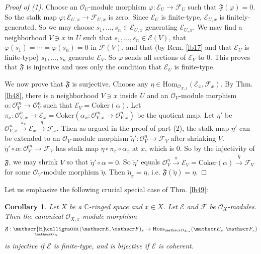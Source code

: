 \documentclass[12pt,b5paper,notitlepage]{report}
\theoremstyle{definition}
\theoremstyle{plain}
\newtheorem{co}[df]{Corollary}
\DeclareMathOperator{\shom}{\mathscr{H}\text{\kern -3pt {\calligra\large om}}\,}
\newcommand{\fk}{\mathfrak}
\newcommand{\wtd}{\widetilde}
\newcommand{\Hom}{\mathrm{Hom}}
\newcommand{\scr}{\mathscr}
\newcommand{\Cbb}{\mathbb C}
\newcommand{\Cok}{\mathrm{Coker}}
\numberwithin{equation}{section}
\begin{document}
\begin{proof}[Proof of (1)]
Choose an $\scr O_U$-module morphism $\varphi:\scr E_U\rightarrow\scr F_U$ such that $\fk F(\varphi)=0$. So the stalk map $\varphi:\scr E_{U,x}\rightarrow\scr F_{U,x}$ is zero. Since $\scr E_U$ is finite-type, $\scr E_{U,x}$ is finitely-generated. So we may choose $s_1,\dots,s_n\in\scr E_{U,x}$ generating $\scr E_{U,x}$. We may find a neighborhood $V\ni x$ in $U$ such that $s_1,\dots,s_n\in\scr E(V)$, that $\varphi(s_1)=\cdots=\varphi(s_n)=0$ in $\scr F(V)$, and that (by Rem. \ref{lb17} and that $\scr E_U$ is finite-type) $s_1,\dots,s_n$ generate $\scr E_V$. So $\varphi$ sends all sections of $\scr E_V$ to $0$. This proves that $\fk F$ is injective and uses only the condition that $\scr E_U$ is finite-type.

We now prove that $\fk F$ is surjective. Choose any $\eta\in\Hom_{\scr O_{X,x}}(\scr E_x,\scr F_x)$. By Thm. \ref{lb48}, there is a neighborhood $V\ni x$ inside $U$ and an $\scr O_V$-module morphism $\alpha:\scr O_V^m\rightarrow\scr O_V^n$ such that $\scr E_V=\Cok(\alpha)$. Let $\pi_x:\scr O_{V,x}^n\rightarrow\scr E_x=\Cok(\alpha_x:\scr O_{V,x}^m\rightarrow\scr O_{V,x}^n)$ be the quotient map. Let $\eta'$ be $\scr O_{V,x}^n\xrightarrow{\pi_x}\scr E_x\xrightarrow{\eta}\scr F_x$. Then as argued in the proof of part (2), the stalk map $\eta'$ can be extended to an $\scr O_V$-module morphism $\wtd\eta':\scr O_V^n\rightarrow\scr F_V$ after shrinking $V$. $\wtd\eta'\circ\alpha:\scr O_V^m\rightarrow\scr F_V$ has stalk map $\eta\circ\pi_x\circ\alpha_x$ at $x$, which is $0$. So by the injectivity of $\fk F$, we may shrink $V$ so that $\wtd\eta'\circ\alpha=0$. So $\wtd\eta'$ equals $\scr O_V^n\xrightarrow{\pi} \scr E_V=\Cok(\alpha)\xrightarrow{\wtd\eta}\scr F_V$ for some $\scr O_V$-module morphism $\wtd\eta$. Then $\wtd\eta_x=\eta$, i.e. $\fk F(\wtd\eta)=\eta$.
\end{proof}



Let us emphasize the following crucial special case of Thm. \ref{lb49}:

\begin{co}\label{lb50}
Let $X$ be a $\Cbb$-ringed space and $x\in X$. Let $\scr E$ and $\scr F$ be $\scr O_X$-modules. Then the canonical $\scr O_{X,x}$-module morphism
\begin{align}
\fk F:\shom_{\scr O_X}(\scr E,\scr F)_x\rightarrow\Hom_{\scr O_{X,x}}(\scr E_x,\scr F_x)
\end{align}
is injective if $\scr E$ is finite-type, and is bijective if $\scr E$ is coherent.
\end{co}
\end{document}
